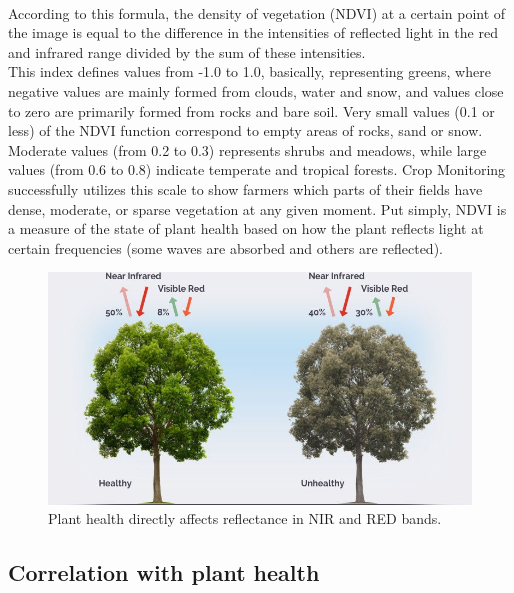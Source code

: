 \documentclass[12pt, a4paper]{report}
\begin{document}
\paragraph{}
According to this formula, the density of vegetation (NDVI) at a certain point of the image is equal to the difference in the intensities of reflected light in the red and infrared range divided by the sum of these intensities.\\
This index defines values from -1.0 to 1.0, basically, representing greens, where negative values are mainly formed from clouds, water and snow, and values close to zero are primarily formed from rocks and bare soil. Very small values (0.1 or less) of the NDVI
function correspond to empty areas of rocks, sand or snow. Moderate values (from 0.2 to 0.3) represents shrubs and meadows, while large values (from 0.6 to 0.8) indicate temperate and tropical forests. Crop Monitoring successfully utilizes this scale to show farmers which parts of their fields have dense, moderate, or sparse vegetation at any given moment. Put simply, NDVI is a measure of the state of plant health based on how the plant reflects light at certain frequencies (some waves are absorbed and others are reflected).
\begin{figure}[h]
\centering
\includegraphics[width=\textwidth]{ndviillustration.jpg}
\caption{Plant health directly affects reflectance in NIR and RED bands.}
\end{figure}
\subsection{Correlation with plant health}
\end{document}
